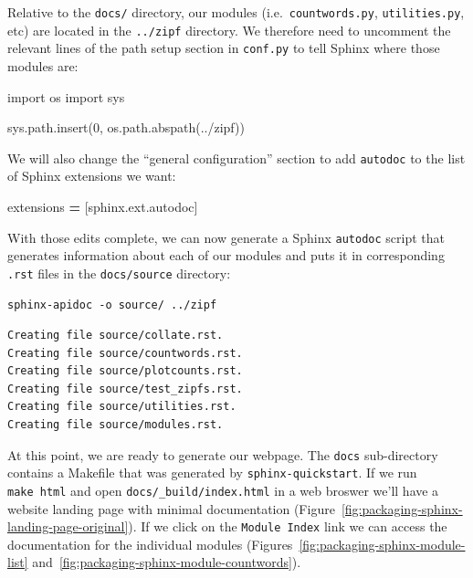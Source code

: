 \documentclass[
]{krantz}
\makeatletter
\newenvironment{Shaded}{\begin{snugshade}}{\end{snugshade}}
\newcommand{\DecValTok}[1]{\textcolor[rgb]{0.00,0.00,0.81}{#1}}
\newcommand{\ImportTok}[1]{#1}
\newcommand{\NormalTok}[1]{#1}
\newcommand{\OperatorTok}[1]{\textcolor[rgb]{0.81,0.36,0.00}{\textbf{#1}}}
\newcommand{\StringTok}[1]{\textcolor[rgb]{0.31,0.60,0.02}{#1}}
\newenvironment{kframe}{%
\medskip{}
\setlength{\fboxsep}{.8em}
 \def\at@end@of@kframe{}%
 \ifinner\ifhmode%
  \def\at@end@of@kframe{\end{minipage}}%
  \begin{minipage}{\columnwidth}%
 \fi\fi%
 \def\FrameCommand##1{\hskip\@totalleftmargin \hskip-\fboxsep
 \colorbox{shadecolor}{##1}\hskip-\fboxsep
     \hskip-\linewidth \hskip-\@totalleftmargin \hskip\columnwidth}%
 \MakeFramed {\advance\hsize-\width
   \@totalleftmargin\z@ \linewidth\hsize
   \@setminipage}}%
 {\par\unskip\endMakeFramed%
 \at@end@of@kframe}
\renewenvironment{Shaded}{\begin{kframe}}{\end{kframe}}
\makeatother
\begin{document}
Relative to the \texttt{docs/} directory,
our modules (i.e.~\texttt{countwords.py}, \texttt{utilities.py}, etc) are located in the \texttt{../zipf} directory.
We therefore need to uncomment the relevant lines of the path setup section in \texttt{conf.py}
to tell Sphinx where those modules are:

\begin{Shaded}
\begin{Highlighting}[]
\ImportTok{import}\NormalTok{ os}
\ImportTok{import}\NormalTok{ sys}

\NormalTok{sys.path.insert(}\DecValTok{0}\NormalTok{, os.path.abspath(}\StringTok{\textquotesingle{}../zipf\textquotesingle{}}\NormalTok{))}
\end{Highlighting}
\end{Shaded}

We will also change the ``general configuration'' section
to add \texttt{autodoc} to the list of Sphinx extensions we want:

\begin{Shaded}
\begin{Highlighting}[]
\NormalTok{extensions }\OperatorTok{=}\NormalTok{ [}\StringTok{\textquotesingle{}sphinx.ext.autodoc\textquotesingle{}}\NormalTok{]}
\end{Highlighting}
\end{Shaded}

With those edits complete,
we can now generate a Sphinx \texttt{autodoc} script
that generates information about each of our modules
and puts it in corresponding \texttt{.rst} files in the \texttt{docs/source} directory:

\begin{verbatim}
sphinx-apidoc -o source/ ../zipf
\end{verbatim}

\begin{verbatim}
Creating file source/collate.rst.
Creating file source/countwords.rst.
Creating file source/plotcounts.rst.
Creating file source/test_zipfs.rst.
Creating file source/utilities.rst.
Creating file source/modules.rst.
\end{verbatim}

At this point, we are ready to generate our webpage.
The \texttt{docs} sub-directory contains a Makefile that was generated by \texttt{sphinx-quickstart}.
If we run \texttt{make\ html} and open \texttt{docs/\_build/index.html} in a web broswer
we'll have a website landing page with minimal documentation (Figure~\ref{fig:packaging-sphinx-landing-page-original}).
If we click on the \texttt{Module\ Index} link we can access the documentation for the individual modules
(Figures~\ref{fig:packaging-sphinx-module-list} and~\ref{fig:packaging-sphinx-module-countwords}).
\end{document}
